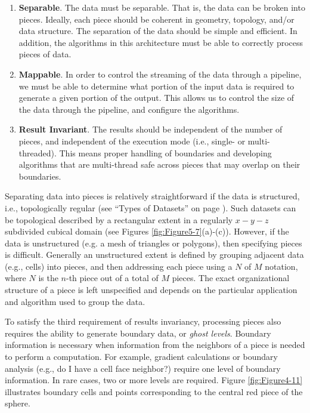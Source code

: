 \begin{enumerate}
\item \textbf{Separable}. The data must be separable. That is, the data can be broken into pieces. Ideally, each piece should be coherent in geometry, topology, and/or data structure. The separation of the data should be simple and efficient. In addition, the algorithms in this architecture must be able to correctly process pieces of data.

\item \textbf{Mappable}. In order to control the streaming of the data through a pipeline, we must be able to determine what portion of the input data is required to generate a given portion of the output. This allows us to control the size of the data through the pipeline, and configure the algorithms.

\item \textbf{Result Invariant}. The results should be independent of the number of pieces, and independent of the execution mode (i.e., single- or multi-threaded). This means proper handling of boundaries and developing algorithms that are multi-thread safe across pieces that may overlap on their boundaries.
\end{enumerate}

Separating data into pieces is relatively straightforward if the data is structured, i.e., topologically regular (see ``Types of Datasets'' on page \pageref{sec:types_of_datasets}). Such datasets can be topological described by a rectangular extent in a regularly $x-y-z$ subdivided cubical domain (see Figures \ref{fig:Figure5-7}(a)-(c)). However, if the data is unstructured (e.g. a mesh of triangles or polygons), then specifying pieces is difficult. Generally an unstructured extent is defined by grouping adjacent data (e.g., cells) into pieces, and then addressing each piece using a $N$ of $M$ notation, where $N$ is the $n$-th piece out of a total of $M$ pieces. The exact organizational structure of a piece is left unspecified and depends on the particular application and algorithm used to group the data.

To satisfy the third requirement of results invariancy, processing pieces also requires the ability to generate boundary data, or \emph{ghost levels}. Boundary information is necessary when information from the neighbors of a piece is needed to perform a computation. For example, gradient calculations or boundary analysis (e.g., do I have a cell face neighbor?) require one level of boundary information. In rare cases, two or more levels are required. Figure \ref{fig:Figure4-11} illustrates boundary cells and points corresponding to the central red piece of the sphere.

